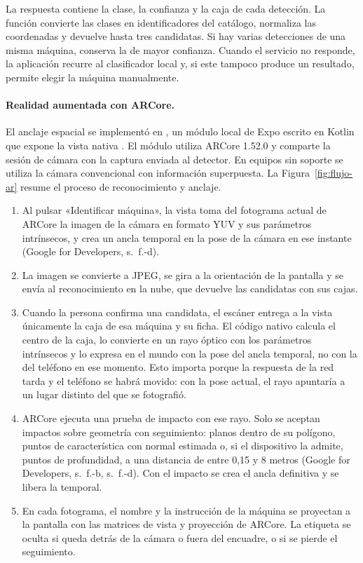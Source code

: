 La respuesta contiene la clase, la confianza y la caja de cada detección.
La función convierte las clases en identificadores del catálogo, normaliza
las coordenadas y devuelve hasta tres candidatas. Si hay varias detecciones
de una misma máquina, conserva la de mayor confianza. Cuando el servicio no
responde, la aplicación recurre al clasificador local y, si este tampoco
produce un resultado, permite elegir la máquina manualmente.

\paragraph{Realidad aumentada con ARCore.} El anclaje espacial se implementó
en , un módulo local de Expo escrito en Kotlin que
expone la vista nativa . El módulo utiliza ARCore 1.52.0 y
comparte la sesión de cámara con la captura enviada al detector. En equipos
sin soporte se utiliza la cámara convencional con información superpuesta.
La Figura~\ref{fig:flujo-ar} resume el proceso de reconocimiento y anclaje.

\begin{enumerate}
    \item Al pulsar «Identificar máquina», la vista toma del fotograma actual de
    ARCore la imagen de la cámara en formato YUV y sus parámetros intrínsecos, y
    crea un ancla temporal en la pose de la cámara en ese instante
    (Google for Developers, s.~f.-d).
    \item La imagen se convierte a JPEG, se gira a la orientación de la pantalla
    y se envía al reconocimiento en la nube, que devuelve las candidatas con sus
    cajas.
    \item Cuando la persona confirma una candidata, el escáner entrega a la vista
    únicamente la caja de esa máquina y su ficha. El código nativo calcula el
    centro de la caja, lo convierte en un rayo óptico con los parámetros
    intrínsecos y lo expresa en el mundo con la pose del ancla temporal, no con
    la del teléfono en ese momento. Esto importa porque la respuesta de la red
    tarda y el teléfono se habrá movido: con la pose actual, el rayo apuntaría a
    un lugar distinto del que se fotografió.
    \item ARCore ejecuta una prueba de impacto con ese rayo. Solo se aceptan
    impactos sobre geometría con seguimiento: planos dentro de su polígono,
    puntos de característica con normal estimada o, si el dispositivo la admite,
    puntos de profundidad, a una distancia de entre 0,15 y 8 metros
    (Google for Developers, s.~f.-b, s.~f.-d). Con el impacto se crea el ancla
    definitiva y se libera la temporal.
    \item En cada fotograma, el nombre y la instrucción de la máquina se
    proyectan a la pantalla con las matrices de vista y proyección de ARCore. La
    etiqueta se oculta si queda detrás de la cámara o fuera del encuadre, o si
    se pierde el seguimiento.
\end{enumerate}

